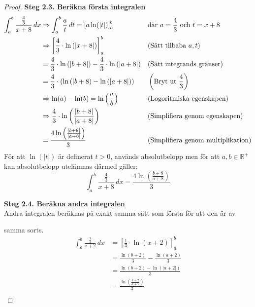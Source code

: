 \documentclass{article}
\begin{document}
\begin{proof}
\textbf{Steg 2.3. Beräkna första integralen}
\begin{align*}
	\int_a^b \frac{\frac{4}{3}}{x + 8} \, dx 
	&\Rightarrow \int_a^b \frac{a}{t} \, dt = \left[a\ln(|t|)\right]_a^b
	&&\text{där  \( a = \frac{4}{3} \) och \(t = x + 8 \) } \\
	&\Rightarrow \left[\frac{4}{3} \cdot \ln{(|x + 8|)}\right]_a^b 
	&&\text{(Sätt tilbaba \( a,t \))} \\
	&= \frac{4}{3} \cdot \ln{(|b + 8|)} 
	-  \frac{4}{3} \cdot \ln{(|a + 8|)}
	&& \text{(Sätt integrands gränser)} \\
	&= \frac{4}{3} \cdot \left(\ln{(|b + 8)} - \ln{(|a + 8|)} \right) 
	&& \left( \text{Bryt ut } \frac{4}{3} \right) \\
	&\Rightarrow \ln(a) - \ln(b) = \ln{\left(\frac{a}{b}\right)} 
	&&\text{(Logoritmiska egenskapen)} \\
	&\Rightarrow \frac{4}{3} \cdot \ln{\left(\frac{|b + 8|}{|a + 8|}\right)} 
	&&\text{(Simplifiera genom egenskapen)} \\ 
	&=  \frac{4\ln{\left(\frac{|b + 8|}{|a + 8|}\right)}}{3}
	&& \text{(Simplifiera genom multiplikation)} \\
\end{align*}
För att \( \ln(|t|) \) är definerat \( t > 0 \), används absolutbelopp
men för att \( a, b \in \mathbb{R}^+ \) kan
absolutbelopp utelämnas därmed gäller:
\[
	\int_a^b \frac{\frac{4}{3}}{x + 8} \, dx 
	= \frac{4\ln\left(\frac{b + 8}{a + 8}\right)}{3}
\]

\textbf{Steg 2.4. Beräkna andra integralen} \\
Andra integralen beräknas på exakt samma sätt som första för att den är av

samma sorts.
\begin{align*}
	\int_a^b \frac{\frac{1}{3}}{x + 2} \, dx 
	&= \left[\frac{1}{3} \cdot \ln{(x + 2)}\right]_a^b  \\
	&= \frac{\ln{(b + 2)}}{3} - \frac{\ln{(a + 2)}}{3} \\
	&= \frac{\ln{(b + 2)} - \ln{(|a + 2|)}}{3} \\
	&= \frac{\ln\left({\frac{{b + 2}}{{a + 2}}}\right)}{3} \\
\end{align*}


\end{proof}
\end{document}
